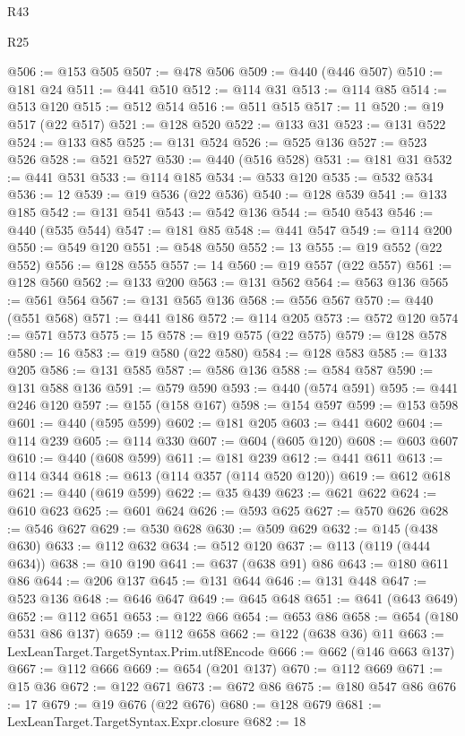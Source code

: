 \begin{lexlean}{R43}
\begin{lexlean}{R25}
\begin{coremodule}
{{{{{{{{{{{{{{{{{{{{{{{{{{{{{{{{{{{{{{{{{{{{{{{{{{{{{{{{{{{{{{{{{{{{{{{{{{{{{{{{{{{{{{{{{{{{{{{{{{{{{{{{{{{{{{{{{{{{{{{{{{{{{{{{{{{{{{{{{{{{{{{{{{{{{{{{{{{{{{{{{{{{{{{{{{{{{{{{{{{{{{{{{{{{{{{{{@506 := @153 @505
@507 := @478 @506
@509 := @440 (@446 @507)
@510 := @181 @24
@511 := @441 @510
@512 := @114 @31
@513 := @114 @85
@514 := @513 @120
@515 := @512 @514
@516 := @511 @515
@517 := 11
@520 := @19 @517 (@22 @517)
@521 := @128 @520
@522 := @133 @31
@523 := @131 @522
@524 := @133 @85
@525 := @131 @524
@526 := @525 @136
@527 := @523 @526
@528 := @521 @527
@530 := @440 (@516 @528)
@531 := @181 @31
@532 := @441 @531
@533 := @114 @185
@534 := @533 @120
@535 := @532 @534
@536 := 12
@539 := @19 @536 (@22 @536)
@540 := @128 @539
@541 := @133 @185
@542 := @131 @541
@543 := @542 @136
@544 := @540 @543
@546 := @440 (@535 @544)
@547 := @181 @85
@548 := @441 @547
@549 := @114 @200
@550 := @549 @120
@551 := @548 @550
@552 := 13
@555 := @19 @552 (@22 @552)
@556 := @128 @555
@557 := 14
@560 := @19 @557 (@22 @557)
@561 := @128 @560
@562 := @133 @200
@563 := @131 @562
@564 := @563 @136
@565 := @561 @564
@567 := @131 @565 @136
@568 := @556 @567
@570 := @440 (@551 @568)
@571 := @441 @186
@572 := @114 @205
@573 := @572 @120
@574 := @571 @573
@575 := 15
@578 := @19 @575 (@22 @575)
@579 := @128 @578
@580 := 16
@583 := @19 @580 (@22 @580)
@584 := @128 @583
@585 := @133 @205
@586 := @131 @585
@587 := @586 @136
@588 := @584 @587
@590 := @131 @588 @136
@591 := @579 @590
@593 := @440 (@574 @591)
@595 := @441 @246 @120
@597 := @155 (@158 @167)
@598 := @154 @597
@599 := @153 @598
@601 := @440 (@595 @599)
@602 := @181 @205
@603 := @441 @602
@604 := @114 @239
@605 := @114 @330
@607 := @604 (@605 @120)
@608 := @603 @607
@610 := @440 (@608 @599)
@611 := @181 @239
@612 := @441 @611
@613 := @114 @344
@618 := @613 (@114 @357 (@114 @520 @120))
@619 := @612 @618
@621 := @440 (@619 @599)
@622 := @35 @439
@623 := @621 @622
@624 := @610 @623
@625 := @601 @624
@626 := @593 @625
@627 := @570 @626
@628 := @546 @627
@629 := @530 @628
@630 := @509 @629
@632 := @145 (@438 @630)
@633 := @112 @632
@634 := @512 @120
@637 := @113 (@119 (@444 @634))
@638 := @10 @190
@641 := @637 (@638 @91) @86
@643 := @180 @611 @86
@644 := @206 @137
@645 := @131 @644
@646 := @131 @448
@647 := @523 @136
@648 := @646 @647
@649 := @645 @648
@651 := @641 (@643 @649)
@652 := @112 @651
@653 := @122 @66
@654 := @653 @86
@658 := @654 (@180 @531 @86 @137)
@659 := @112 @658
@662 := @122 (@638 @36) @11
@663 := LexLeanTarget.TargetSyntax.Prim.utf8Encode
@666 := @662 (@146 @663 @137)
@667 := @112 @666
@669 := @654 (@201 @137)
@670 := @112 @669
@671 := @15 @36
@672 := @122 @671
@673 := @672 @86
@675 := @180 @547 @86
@676 := 17
@679 := @19 @676 (@22 @676)
@680 := @128 @679
@681 := LexLeanTarget.TargetSyntax.Expr.closure
@682 := 18
}}}}}}}}}}}}}}}}}}}}}}}}}}}}}}}}}}}}}}}}}}}}}}}}}}}}}}}}}}}}}}}}}}}}}}}}}}}}}}}}}}}}}}}}}}}}}}}}}}}}}}}}}}}}}}}}}}}}}}}}}}}}}}}}}}}}}}}}}}}}}}}}}}}}}}}}}}}}}}}}}}}}}}}}}}}}}}}}}}}}}}}}}}}}}}}}}
\end{coremodule}
\end{lexlean}
\end{lexlean}
